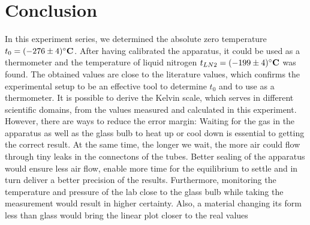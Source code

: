 \section{Conclusion}
    In this experiment series, we determined the absolute zero temperature $t_0 = (-276 \pm 4)\si{\bf\celsius}$.
    After having calibrated the apparatus, it could be used as a thermometer and the temperature of liquid nitrogen $t_{LN2} = (-199 \pm 4)\si{\bf\celsius}$ was found.
    The obtained values are close to the literature values, which confirms the experimental setup to be an effective tool to determine $t_0$ and to use as a thermometer.
    It is possible to derive the Kelvin scale, which serves in different scientific domains, from the values measured and calculated in this experiment.
    However, there are ways to reduce the error margin:
    Waiting for the gas in the apparatus as well as the glass bulb to heat up or cool down is essential to getting the correct result.
    At the same time, the longer we wait, the more air could flow through tiny leaks in the connectons of the tubes.
    Better sealing of the apparatus would ensure less air flow, enable more time for the equilibrium to settle and in turn deliver a better precision of the results.
    Furthermore, monitoring the temperature and pressure of the lab close to the glass bulb while taking the measurement would result in higher certainty.
    Also, a material changing its form less than glass would bring the linear plot closer to the real values

